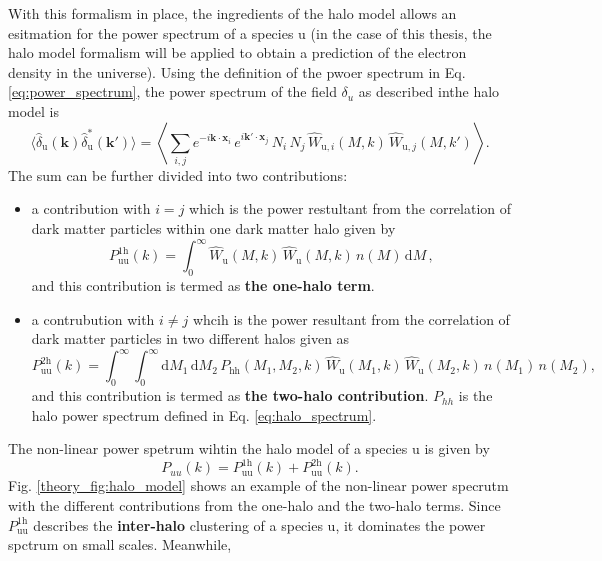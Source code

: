 With this formalism in place, the ingredients of the halo model allows an esitmation for the power spectrum of a species $\mathrm{u}$ (in the case of this thesis, the halo model formalism will be applied to obtain a prediction of the electron density in the universe). Using the definition of the pwoer spectrum in Eq. \ref{eq:power_spectrum}, the power spectrum of the field $\delta_u$ as described inthe halo model is
\begin{equation}
    \langle \hat{\delta}_{\mathrm{u}}(\mathbf{k}) \hat{\delta}_{\mathrm{u}}^*(\mathbf{k}') \rangle = \left\langle \sum_{i,j} e^{-i\mathbf{k}\cdot\mathbf{x}_i} \, e^{i\mathbf{k}'\cdot\mathbf{x}_j} \, N_i \, N_j \, \hat{W}_{\mathrm{u},i}(M,k) \, \hat{W}_{\mathrm{u},j}(M,k') \right\rangle.
\end{equation}
The sum can be further divided into two contributions:
\begin{itemize}
    \item a contribution with $i = j$ which is the power restultant from the correlation of dark matter particles within one dark matter halo given by 
    \begin{equation} \label{eq:1h}
        P_{\mathrm{uu}}^{\mathrm{1h}}(k) = \int_0^{\infty} \hat{W}_{\mathrm{u}}(M,k) \, \hat{W}_{\mathrm{u}}(M,k) \, n(M) \, \mathrm{d}M \, ,
    \end{equation}
    and this contribution is termed as \textbf{the one-halo term}.
    \item a contrubution with $i \neq j$ whcih is the power resultant from the correlation of dark matter particles in two different halos given as
    \begin{equation}\label{eq:2h}
        P_{\mathrm{uu}}^{\mathrm{2h}}(k) = \int_0^{\infty} \int_0^{\infty} \mathrm{d}M_1 \, \mathrm{d}M_2 \, P_{\mathrm{hh}}(M_1, M_2, k) \, \hat{W}_{\mathrm{u}}(M_1, k) \, \hat{W}_{\mathrm{u}}(M_2, k) \, n(M_1) \, n(M_2),
    \end{equation}
    and this contribution is termed as \textbf{the two-halo contribution}. $P_{hh}$ is the halo power spectrum defined in Eq. \ref{eq:halo_spectrum}.
\end{itemize}
The non-linear power spetrum wihtin the halo model of a species $\mathrm{u}$ is given by 
\begin{equation}
    P_{uu}(k) =  P_{\mathrm{uu}}^{\mathrm{1h}}(k) + P_{\mathrm{uu}}^{\mathrm{2h}}(k).
\end{equation}
Fig. \ref{theory_fig:halo_model} shows an example of the non-linear power specrutm with the different contributions from the one-halo and the two-halo terms. Since $P_{\mathrm{uu}}^{\mathrm{1h}}$ describes the \textbf{inter-halo} clustering of a species $\mathrm{u}$, it dominates the power spctrum on small scales. Meanwhile, 



